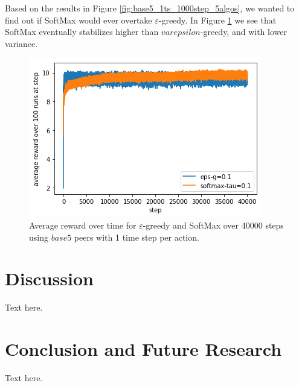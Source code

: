 \documentclass{article}
\begin{document}

Based on the results in Figure \ref{fig:base5_1ts_1000step_5algos}, we wanted to find out if SoftMax would ever overtake $\varepsilon$-greedy. In 
Figure \ref{fig:base5_1ts_40000step_eps_sm} we see that SoftMax eventually stabilizes higher than $varepsilon$-greedy, and with lower variance.
\begin{figure}[h]
    \centering
    \includegraphics[width=1\linewidth]{figs/base5_1ts_40000step_eps-g_softmax.png}
    \caption{Average reward over time for $\varepsilon$-greedy and SoftMax over 40000 steps using $base5$ peers with 1 time step per action.}
    \label{fig:base5_1ts_40000step_eps_sm}
\end{figure}

\section{Discussion}


Text here.

\section{Conclusion and Future Research}

Text here.




\end{document}

